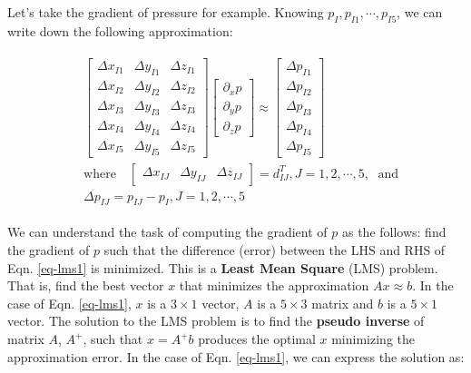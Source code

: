 \documentclass[12pt, letterpaper]{report}
\begin{document}
Let's take the gradient of pressure for example. Knowing $p_I, p_{I1}, \cdots, p_{I5}$, we can write
down the following approximation:

\begin{align}\label{eq-lms1}
   \begin{split}
      &\begin{bmatrix}
         \Delta x_{I1} & \Delta y_{I1} & \Delta z_{I1} \\
         \Delta x_{I2} & \Delta y_{I2} & \Delta z_{I2} \\
         \Delta x_{I3} & \Delta y_{I3} & \Delta z_{I3} \\
         \Delta x_{I4} & \Delta y_{I4} & \Delta z_{I4} \\
         \Delta x_{I5} & \Delta y_{I5} & \Delta z_{I5}
      \end{bmatrix} \begin{bmatrix}\partial_x p \\ \partial_y p \\ \partial_z p\end{bmatrix} \approx
      \begin{bmatrix}\Delta p_{I1} \\\Delta p_{I2} \\\Delta p_{I3} \\\Delta p_{I4} \\\Delta p_{I5}
         \end{bmatrix} \\ &\textrm{where} \quad \begin{bmatrix}\Delta x_{IJ} & \Delta y_{IJ} &
      \Delta z_{IJ}\end{bmatrix} = d_{IJ}^T, J = 1,2,\cdots,5, \; \textrm{ and} \\ &\Delta p_{IJ} =
      p_{IJ} - p_I, J = 1,2,\cdots,5
   \end{split}
\end{align}

We can understand the task of computing the gradient of $p$ as the follows: find the gradient of $p$
such that the difference (error) between the LHS and RHS of Eqn. \ref{eq-lms1} is minimized. This is
a {\bf Least Mean Square} (LMS) problem. That is, find the best vector $x$ that minimizes the
approximation $Ax \approx b$. In the case of Eqn. \ref{eq-lms1}, $x$ is a $3\times1$ vector, $A$ is a
$5\times3$ matrix and $b$ is a $5\times1$ vector. The solution to the LMS problem is to find the
{\bf pseudo inverse} of matrix $A$, $A^+$, such that $x = A^+b$ produces the optimal $x$ minimizing
the approximation error. In the case of Eqn. \ref{eq-lms1}, we can express the solution as:
\end{document}
